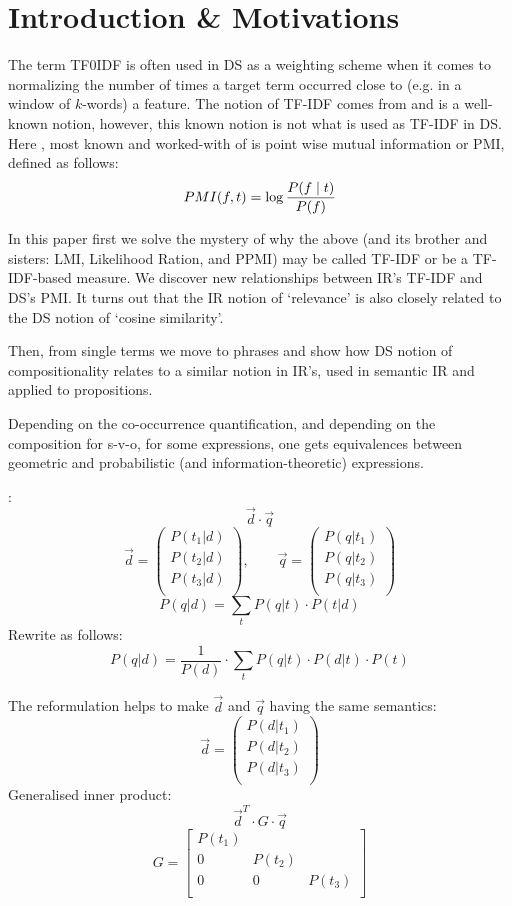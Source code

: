 \section{Introduction \& Motivations}


The term TF0IDF is often used in DS as a weighting scheme when it comes to normalizing  the number of times a target term occurred close to (e.g. in a window of $k$-words) a feature. The notion of TF-IDF comes from and is a well-known notion, however, this known notion is not what is used as TF-IDF in DS. Here ,  most known and worked-with of  is point wise mutual information or  PMI, defined as follows:
\[
 PMI (f, t) =  \log{{P(f \mid t)} \over{P(f)}}
 \]


In this paper first we solve the mystery of why  the above (and its brother and sisters: LMI, Likelihood Ration, and PPMI) may be called TF-IDF or be a TF-IDF-based measure. We discover new relationships between IR's TF-IDF and DS's PMI. It turns out that the IR notion of `relevance'  is also closely related to the DS notion of `cosine similarity'. 

Then, from single terms we move to phrases and show how DS notion of  compositionality relates to a similar notion in  IR's, used in semantic IR and applied to propositions. 


\hrulefill

Depending on the co-occurrence quantification, and depending on the composition for s-v-o, for some expressions, one  gets equivalences between geometric and probabilistic (and information-theoretic) expressions.


\cite{Wong/Yao:95}:
\[
\vec{d} \cdot \vec{q}
\]
\[
\vec{d} =
	\left(
	\begin{matrix}
	P(t_1|d)\\
	P(t_2|d)\\
	P(t_3|d)\\
	\end{matrix}
	\right),
\qquad
\vec{q} =
	\left(
	\begin{matrix}
	P(q|t_1)\\
	P(q|t_2)\\
	P(q|t_3)\\
	\end{matrix}
	\right)
\]
\[
P(q|d) = \sum_t P(q|t) \cdot P(t|d)
\]
Rewrite as follows:
\[
P(q|d) = \frac{1}{P(d)} \cdot \sum_t P(q|t) \cdot P(d|t) \cdot P(t)
\]

The reformulation helps
to make $\vec{d}$ and $\vec{q}$ having the same semantics:
\[
\vec{d} =
	\left(
	\begin{matrix}
	P(d|t_1)\\
	P(d|t_2)\\
	P(d|t_3)\\
	\end{matrix}
	\right)
\]
Generalised inner product:
\[
\vec{d}^T \cdot G \cdot \vec{q}
\]
\[
G=
\left[
\begin{matrix}
P(t_1) \\
0 & P(t_2) \\
0 & 0 & P(t_3) \\
\end{matrix}
\right]
\]


